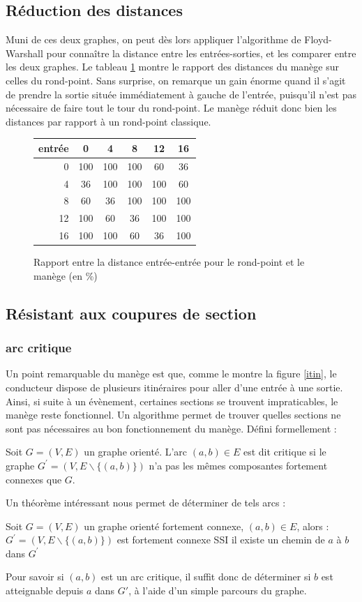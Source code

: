 \documentclass[10pt,draft]{article}
\begin{document}
	\subsection{Réduction des distances}
Muni de ces deux graphes, on peut dès lors appliquer l'algorithme de Floyd-Warshall pour connaître la distance entre les entrées-sorties, et les comparer entre les deux graphes. Le tableau \ref{rpfw} montre le rapport des distances du manège sur celles du rond-point. Sans surprise, on remarque un gain énorme quand il s'agit de prendre la sortie située immédiatement à gauche de l'entrée, puisqu'il n'est pas nécessaire de faire tout le tour du rond-point. Le manège réduit donc bien les distances par rapport à un rond-point classique.

\begin{figure}
	\caption{\label{rpfw} Rapport entre la distance entrée-entrée pour le rond-point et le manège (en \%)}
	\begin{center}
	\begin{tabular}{ r|c c c c c}
  entrée & 0 & 4 & 8 & 12 & 16 \\ \hline
  0 & 100 & 100 & 100 & 60 & 36 \\
4 & 36 & 100 & 100 & 100 & 60 \\
8 & 60 & 36 & 100 & 100 & 100 \\
12 & 100 & 60 & 36 & 100 & 100 \\
16 & 100 & 100 & 60 & 36 & 100 \\
	\end{tabular}
	\end{center}
\end{figure}
	\subsection{Résistant aux coupures de section}
		\subsubsection{arc critique}
	Un point remarquable du manège est que, comme le montre la figure \ref{itin}, le conducteur dispose de plusieurs itinéraires pour aller d'une entrée à une sortie. Ainsi, si suite à un évènement, certaines sections se trouvent impraticables, le manège reste fonctionnel. Un algorithme permet de trouver quelles sections ne sont pas nécessaires au bon fonctionnement du manège. Défini formellement :
\begin{defin}
	Soit $G = (V,E)$ un graphe orienté. L'arc $(a,b) \in E$ est dit critique si le graphe $G^\prime = (V,E\backslash \{(a,b)\})$ n'a pas les mêmes composantes fortement connexes que $G$.
\end{defin}
Un théorème intéressant nous permet de déterminer de tels arcs : 
\begin{theo}
		Soit $G=(V,E)$ un graphe orienté fortement connexe, $(a,b) \in E$, alors :
		$G^\prime = (V,E\backslash \{ (a,b) \})$ est fortement connexe SSI il existe un chemin de $a$ à $b$
		dans $G^\prime$
\end{theo}
Pour savoir si $(a,b)$ est un arc critique, il suffit donc de déterminer si $b$ est atteignable depuis $a$ dans $G\prime$, à l'aide d'un simple parcours du graphe.
\end{document}
